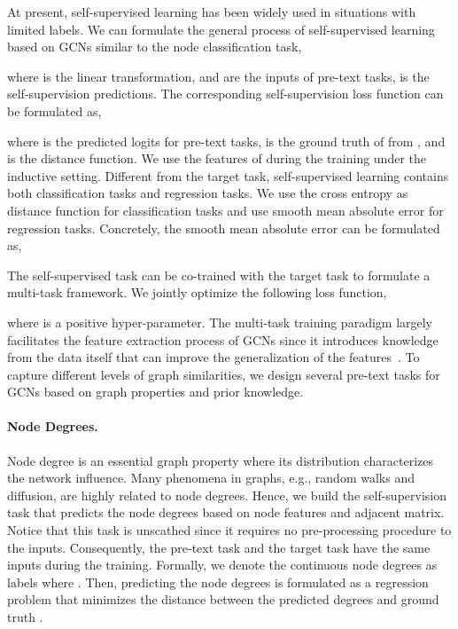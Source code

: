 \documentclass[letterpaper]{article} \usepackage{aaai22} \usepackage{times} \usepackage{helvet} \usepackage{courier} \usepackage[hyphens]{url} \usepackage{graphicx} \urlstyle{rm} \def\UrlFont{\rm} \usepackage{subfigure}
\begin{document}
	At present, self-supervised learning has been widely used in situations with limited labels. We can formulate the general process of self-supervised learning based on GCNs similar to the node classification task,
	
	where  is the linear transformation,  and   are the inputs of pre-text tasks,  is the self-supervision predictions. The corresponding self-supervision loss function  can be formulated as,
	
	where  is the predicted logits for pre-text tasks,  is the ground truth of  from , and  is the distance function. We use the features of  during the training under the inductive setting. Different from the target task, self-supervised learning contains both classification tasks and regression tasks. We use the cross entropy as distance function for classification tasks and use smooth mean absolute error for regression tasks. Concretely, the smooth mean absolute error can be formulated as,
	
	
	The self-supervised task can be co-trained with the target task to formulate a multi-task framework. We jointly optimize the following loss function,
	
	where  is a positive hyper-parameter. The multi-task training paradigm largely facilitates the feature extraction process of GCNs since it introduces knowledge from the data itself that can improve the generalization of the features~\cite{Yuning2020Whendoes, Zhu2020MultiStageSS}. To capture different levels of graph similarities, we design several pre-text tasks for GCNs based on graph properties and prior knowledge.
	
	\paragraph{Node Degrees.} Node degree is an essential graph property where its distribution characterizes the network influence. Many phenomena in graphs, e.g., random walks and diffusion, are highly related to node degrees. Hence, we build the self-supervision task that predicts the node degrees based on node features and adjacent matrix. Notice that this task is unscathed since it requires no pre-processing procedure to the inputs. Consequently, the pre-text task and the target task have the same inputs during the training. Formally, we denote the continuous node degrees as labels  where . Then, predicting the node degrees is formulated as a regression problem that minimizes the distance between the predicted degrees  and ground truth .
	
\end{document}
